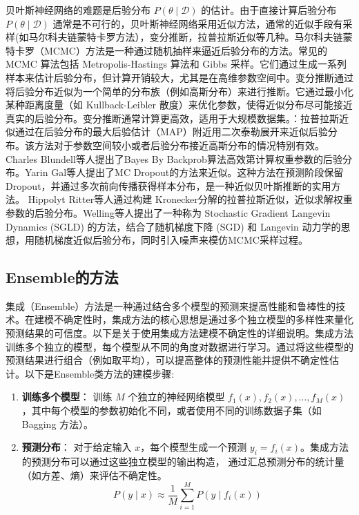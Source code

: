 贝叶斯神经网络的难题是后验分布 \( P(\theta \mid \mathcal{D}) \) 的估计。由于直接计算后验分布 \( P(\theta \mid \mathcal{D}) \) 通常是不可行的，贝叶斯神经网络采用近似方法，通常的近似手段有采样(如马尔科夫链蒙特卡罗方法），变分推断，拉普拉斯近似等几种。马尔科夫链蒙特卡罗（MCMC）方法是一种通过随机抽样来逼近后验分布的方法。常见的 MCMC 算法包括 Metropolis-Hastings 算法和 Gibbs 采样。它们通过生成一系列样本来估计后验分布，但计算开销较大，尤其是在高维参数空间中。变分推断通过将后验分布近似为一个简单的分布族（例如高斯分布）来进行推断。它通过最小化某种距离度量（如 Kullback-Leibler 散度）来优化参数，使得近似分布尽可能接近真实的后验分布。变分推断通常计算更高效，适用于大规模数据集。：拉普拉斯近似通过在后验分布的最大后验估计（MAP）附近用二次泰勒展开来近似后验分布。该方法对于参数空间较小或者后验分布接近高斯分布的情况特别有效。Charles Blundell\cite{blundell2015weight}等人提出了Bayes By Backprob算法高效第计算权重参数的后验分布。Yarin Gal\cite{gal2016dropout}等人提出了MC Dropout的方法来近似。这种方法在预测阶段保留 Dropout，并通过多次前向传播获得样本分布，是一种近似贝叶斯推断的实用方法。 Hippolyt Ritter\cite{ritter2018scalable}等人通过构建  Kronecker分解的拉普拉斯近似，近似求解权重参数的后验分布。Welling等人\cite{welling2011bayesian}提出了一种称为 Stochastic Gradient Langevin Dynamics (SGLD) 的方法，结合了随机梯度下降 (SGD) 和 Langevin 动力学的思想，用随机梯度近似后验分布，同时引入噪声来模仿MCMC采样过程。



\subsection{Ensemble的方法}
集成（Ensemble）方法\cite{lakshminarayanan2017simple}是一种通过结合多个模型的预测来提高性能和鲁棒性的技术。在建模不确定性时，集成方法的核心思想是通过多个独立模型的多样性来量化预测结果的可信度。以下是关于使用集成方法建模不确定性的详细说明。集成方法训练多个独立的模型，每个模型从不同的角度对数据进行学习。通过将这些模型的预测结果进行组合（例如取平均），可以提高整体的预测性能并提供不确定性估计。以下是Ensemble类方法的建模步骤:


\begin{enumerate}
    \item \textbf{训练多个模型}：
    训练 \( M \) 个独立的神经网络模型 \( f_1(x), f_2(x), \ldots, f_M(x) \)，其中每个模型的参数初始化不同，或者使用不同的训练数据子集（如 Bagging 方法）。

    \item \textbf{预测分布}：
    对于给定输入 \( x \)，每个模型生成一个预测 \( y_i = f_i(x) \)。集成方法的预测分布可以通过这些独立模型的输出构造， 通过汇总预测分布的统计量（如方差、熵）来评估不确定性。
    \[
    P(y \mid x) \approx \frac{1}{M} \sum_{i=1}^M P(y \mid f_i(x))
    \]
\end{enumerate}

